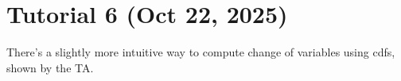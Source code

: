 \section{Tutorial 6 (Oct 22, 2025)}

There's a slightly more intuitive way to compute change of variables using cdfs, shown by the TA.
